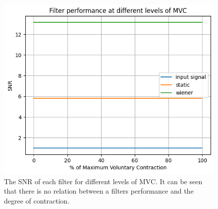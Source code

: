 \begin{figure}[h!t]
	\begin{center}
		\includegraphics[width=1.0\columnwidth]{images/filter_snr_mvc.png}
	\end{center}
	\caption{The SNR of each filter for different levels of MVC. It can be seen that there is no relation between a filters performance and the degree of contraction.}
	\label{fig:filter_snr_mvc}
\end{figure}


